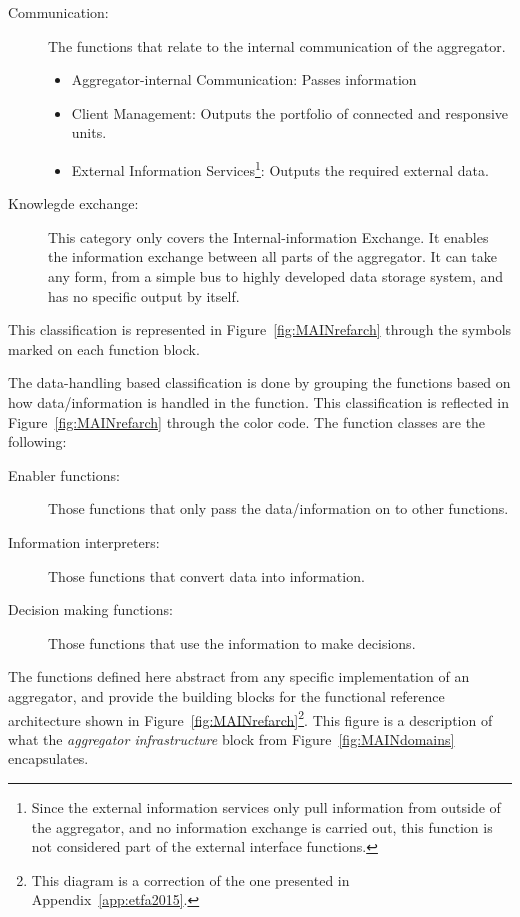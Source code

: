 \begin{description}
\begin{itemize}
		\end{itemize}
	\item[Communication:] The functions that relate to the internal communication of the aggregator.
		\begin{itemize}
			\item Aggregator-internal Communication: Passes information
			\item Client Management: Outputs the portfolio of connected and responsive units.
			\item External Information Services\footnote{Since the external information services only pull information from outside of the aggregator, and no information exchange is carried out, this function is not considered part of the external interface functions.}: Outputs the required external data.
		\end{itemize}
	\item[Knowlegde exchange:] This category only covers the Internal-information Exchange. It enables the information exchange between all parts of the aggregator. It can take any form, from a simple bus to highly developed data storage system, and has no specific output by itself.
\end{description}
This classification is represented in Figure~\ref{fig:MAINrefarch} through the symbols marked on each function block.

The data-handling based classification is done by grouping the functions based on how data/information is handled in the function. This classification is reflected in Figure~\ref{fig:MAINrefarch} through the color code. The function classes are the following:
\begin{description}
	\item[Enabler functions:] Those functions that only pass the data/information on to other functions.
	\item[Information interpreters:] Those functions that convert data into information.
	\item[Decision making functions:] Those functions that use the information to make decisions.
\end{description}

The functions defined here abstract from any specific implementation of an aggregator, and provide the building blocks for the functional reference architecture shown in Figure~\ref{fig:MAINrefarch}\footnote{This diagram is a correction of the one presented in Appendix~\ref{app:etfa2015}.}. This figure is a description of what the \emph{aggregator infrastructure} block from Figure~\ref{fig:MAINdomains} encapsulates.

